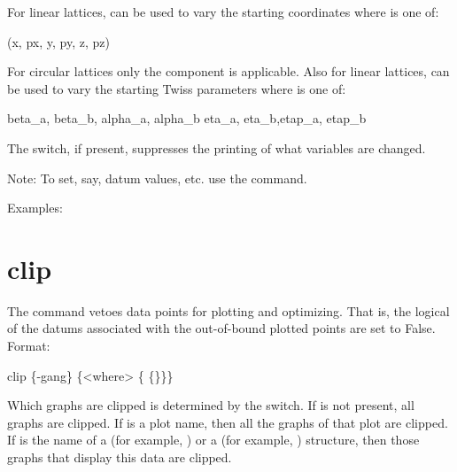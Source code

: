For linear lattices,  
can be used to vary the starting coordinates where  is one of: 
\begin{example}
  (x, px, y, py, z, pz)
\end{example}
For circular lattices only the  component is applicable. 
Also for linear lattices,  can be used to
vary the starting Twiss parameters where  is one of:  
\begin{example}
  beta_a, beta_b, alpha_a, alpha_b 
  eta_a, eta_b,etap_a, etap_b    
\end{example}

The  switch, if present, suppresses the printing of what
variables are changed.

Note: To set, say, datum values, etc. use the  command.

Examples:


\section{clip}
\label{s:clip}

The  command vetoes data points for plotting and
optimizing. That is, the  logical of the datums
associated with the out-of-bound plotted points are set to False.
Format:
\begin{example}
  clip \{-gang\} \{<where> \{<limit1> \{<limit2>\}\}\}
\end{example}

\vskip 0.2in 

Which graphs are clipped is determined by the  switch. If
 is not present, all graphs are clipped. If  is a
plot name, then all the graphs of that plot are clipped. If 
is the name of a  (for example, ) or a
 (for example, ) structure, then those graphs
that display this data are clipped.


